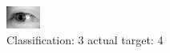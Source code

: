 \begin{figure}[h!]
\begin{center}
\includegraphics[width=0.60\columnwidth]{figures/ID3249_class_3_target_4.png}
\end{center}
\caption{ Classification: 3 actual target: 4}
\label{fig:ID3249_class_3_target_4}
\end{figure}

